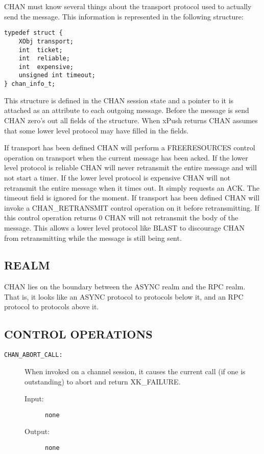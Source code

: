 CHAN must know several things about the transport protocol used 
to actually send the message. This information is represented in 
the following structure:

\begin{verbatim}
typedef struct {
    XObj transport;
    int  ticket;
    int  reliable;
    int  expensive;
    unsigned int timeout;
} chan_info_t;
\end{verbatim}

This structure is defined in the CHAN session state and a pointer 
to it is attached as an attribute to each outgoing message. Before 
the message is send CHAN zero's out all fields of the structure.
When xPush returns CHAN assumes that some lower level 
protocol may have filled in the fields.
 
If transport has been defined CHAN will perform a FREERESOURCES control 
operation on transport when the current message has been acked. If 
the lower level protocol is reliable CHAN will never retransmit the 
entire message and will not start a timer. If the lower level protocol 
is expensive CHAN will not retransmit the entire message when it times 
out. It simply requests an ACK. The timeout field is ignored for the 
moment. If transport has been defined CHAN will invoke a 
CHAN\_RETRANSMIT control operation on it before retransmitting. 
If this control operation returns 0 CHAN will not retransmit the 
body of the message. This allows  a lower level protocol like BLAST 
to discourage CHAN from retransmitting while the message is still being 
sent.

\subsection*{REALM}

CHAN lies on the boundary between the ASYNC realm and the RPC realm.
That is, it looks like an ASYNC protocol to protocols below it, and
an RPC protocol to protocols above it.

\subsection*{CONTROL OPERATIONS}

\begin{description}

\item[{\tt CHAN\_ABORT\_CALL:}]
When invoked on a channel session, it causes the current call (if one
is outstanding) to abort and return XK\_FAILURE.
\begin{description}
\item[{\rm Input:}] {\tt none }
\item[{\rm Output:}] {\tt none }
\end{description}

\end{description}



